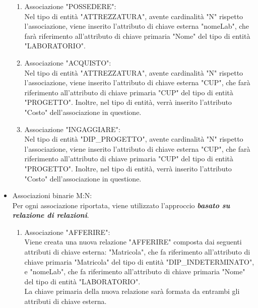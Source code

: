 \begin{itemize}
\begin{enumerate}
            \item Associazione "POSSEDERE":\\
                Nel tipo di entità "ATTREZZATURA", avente cardinalità "N" rispetto l'associazione, viene inserito l'attributo di chiave esterna "nomeLab", che farà riferimento all'attributo di chiave primaria "Nome" del tipo di entità "LABORATORIO".
            
            \item Associazione "ACQUISTO":\\
                Nel tipo di entità "ATTREZZATURA", avente cardinalità "N" rispetto l'associazione, viene inserito l'attributo di chiave esterna "CUP", che farà riferimento all'attributo di chiave primaria "CUP" del tipo di entità "PROGETTO". Inoltre, nel tipo di entità, verrà inserito l'attributo "Costo" dell'associazione in questione.
            
            \item Associazione "INGAGGIARE":\\
                Nel tipo di entità "DIP\_PROGETTO", avente cardinalità "N" rispetto l'associazione, viene inserito l'attributo di chiave esterna "CUP", che farà riferimento all'attributo di chiave primaria "CUP" del tipo di entità "PROGETTO". Inoltre, nel tipo di entità, verrà inserito l'attributo "Costo" dell'associazione in questione.
            
        \end{enumerate}

        \newpage

        \item Associazioni binarie M:N:\\
            Per ogni associazione riportata, viene utilizzato l'approccio \textbf{\textit{basato su relazione di relazioni}}.

        \begin{enumerate}
            \item Associazione "AFFERIRE":\\
                Viene creata una nuova relazione "AFFERIRE" composta dai seguenti attributi di chiave esterna: "Matricola", che fa riferimento all'attributo di chiave primaria "Matricola" del tipo di entità "DIP\_INDETERMINATO", e "nomeLab", che fa riferimento all'attributo di chiave primaria "Nome" del tipo di entità "LABORATORIO".\\
                La chiave primaria della nuova relazione sarà formata da entrambi gli attributi di chiave esterna.


\end{enumerate}
\end{itemize}
